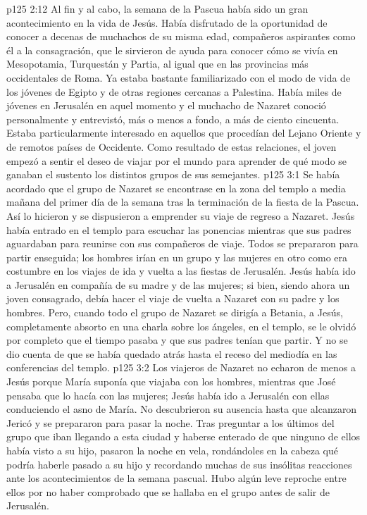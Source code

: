 \vs p125 2:12 Al fin y al cabo, la semana de la Pascua había sido un gran acontecimiento en la vida de Jesús. Había disfrutado de la oportunidad de conocer a decenas de muchachos de su misma edad, compañeros aspirantes como él a la consagración, que le sirvieron de ayuda para conocer cómo se vivía en Mesopotamia, Turquestán y Partia, al igual que en las provincias más occidentales de Roma. Ya estaba bastante familiarizado con el modo de vida de los jóvenes de Egipto y de otras regiones cercanas a Palestina. Había miles de jóvenes en Jerusalén en aquel momento y el muchacho de Nazaret conoció personalmente y entrevistó, más o menos a fondo, a más de ciento cincuenta. Estaba particularmente interesado en aquellos que procedían del Lejano Oriente y de remotos países de Occidente. Como resultado de estas relaciones, el joven empezó a sentir el deseo de viajar por el mundo para aprender de qué modo se ganaban el sustento los distintos grupos de sus semejantes.
\vs p125 3:1 Se había acordado que el grupo de Nazaret se encontrase en la zona del templo a media mañana del primer día de la semana tras la terminación de la fiesta de la Pascua. Así lo hicieron y se dispusieron a emprender su viaje de regreso a Nazaret. Jesús había entrado en el templo para escuchar las ponencias mientras que sus padres aguardaban para reunirse con sus compañeros de viaje. Todos se prepararon para partir enseguida; los hombres irían en un grupo y las mujeres en otro como era costumbre en los viajes de ida y vuelta a las fiestas de Jerusalén. Jesús había ido a Jerusalén en compañía de su madre y de las mujeres; si bien, siendo ahora un joven consagrado, debía hacer el viaje de vuelta a Nazaret con su padre y los hombres. Pero, cuando todo el grupo de Nazaret se dirigía a Betania, a Jesús, completamente absorto en una charla sobre los ángeles, en el templo, se le olvidó por completo que el tiempo pasaba y que sus padres tenían que partir. Y no se dio cuenta de que se había quedado atrás hasta el receso del mediodía en las conferencias del templo.
\vs p125 3:2 Los viajeros de Nazaret no echaron de menos a Jesús porque María suponía que viajaba con los hombres, mientras que José pensaba que lo hacía con las mujeres; Jesús había ido a Jerusalén con ellas conduciendo el asno de María. No descubrieron su ausencia hasta que alcanzaron Jericó y se prepararon para pasar la noche. Tras preguntar a los últimos del grupo que iban llegando a esta ciudad y haberse enterado de que ninguno de ellos había visto a su hijo, pasaron la noche en vela, rondándoles en la cabeza qué podría haberle pasado a su hijo y recordando muchas de sus insólitas reacciones ante los acontecimientos de la semana pascual. Hubo algún leve reproche entre ellos por no haber comprobado que se hallaba en el grupo antes de salir de Jerusalén.
